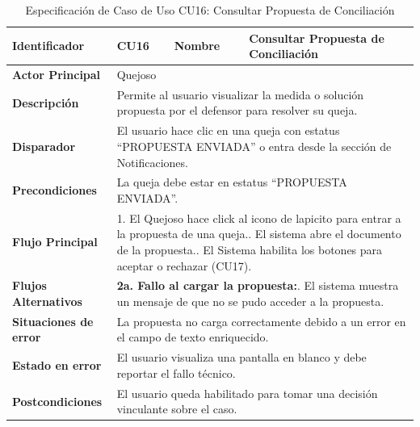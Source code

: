 \vspace{0.8cm}

\begingroup
\setlength{\parskip}{0pt}
\begin{longtable}{|p{3.5cm}|p{2cm}|p{2.5cm}|p{7cm}|}
\caption{Especificación de Caso de Uso CU16: Consultar Propuesta de Conciliación}
\label{tab:cu16_revisar_propuesta} \\
\hline
\textbf{Identificador} & CU16 & \textbf{Nombre} & Consultar Propuesta de Conciliación \\ \hline
\textbf{Actor Principal} & \multicolumn{3}{p{11.5cm}|}{Quejoso} \\ \hline
\textbf{Descripción} & \multicolumn{3}{p{11.5cm}|}{Permite al usuario visualizar la medida o solución propuesta por el defensor para resolver su queja.} \\ \hline
\textbf{Disparador} & \multicolumn{3}{p{11.5cm}|}{El usuario hace clic en una queja con estatus ``PROPUESTA ENVIADA'' o entra desde la sección de Notificaciones.} \\ \hline
\textbf{Precondiciones} & \multicolumn{3}{p{11.5cm}|}{La queja debe estar en estatus ``PROPUESTA ENVIADA''.} \\ \hline
\textbf{Flujo Principal} & \multicolumn{3}{p{11.5cm}|}{1. El Quejoso hace click al icono de lapicito para entrar a la propuesta de una queja.\newline 3. El sistema abre el documento de la propuesta.\newline 4. El Sistema habilita los botones para aceptar o rechazar (CU17).} \\ \hline
\textbf{Flujos Alternativos} & \multicolumn{3}{p{11.5cm}|}{\textbf{2a. Fallo al cargar la propuesta:}\newline 1. El sistema muestra un mensaje de que no se pudo acceder a la propuesta.} \\ \hline
\textbf{Situaciones de error} & \multicolumn{3}{p{11.5cm}|}{La propuesta no carga correctamente debido a un error en el campo de texto enriquecido.} \\ \hline
\textbf{Estado en error} & \multicolumn{3}{p{11.5cm}|}{El usuario visualiza una pantalla en blanco y debe reportar el fallo técnico.} \\ \hline
\textbf{Postcondiciones} & \multicolumn{3}{p{11.5cm}|}{El usuario queda habilitado para tomar una decisión vinculante sobre el caso.} \\ \hline
\end{longtable}
\endgroup

